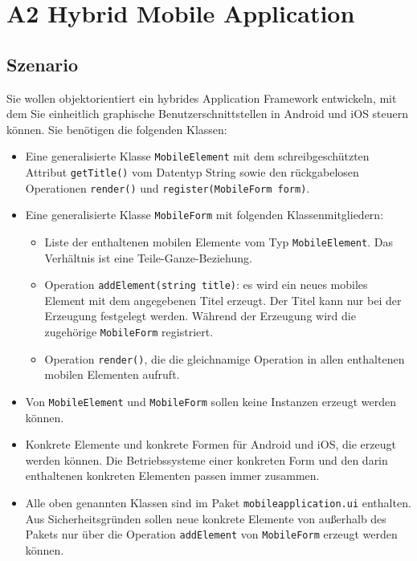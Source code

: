 \documentclass[main.tex]{subfiles}
\begin{document}
\section{A2 Hybrid Mobile Application}

\subsection{Szenario}

Sie wollen objektorientiert ein hybrides Application Framework entwickeln, mit dem Sie einheitlich graphische Benutzerschnittstellen in Android und iOS steuern können. Sie benötigen die folgenden Klassen:

\begin{itemize}
    \item Eine generalisierte Klasse \lstinline|MobileElement| mit dem schreibgeschützten Attribut \lstinline|getTitle()| vom Datentyp String sowie den rückgabelosen Operationen \lstinline|render()| und \lstinline|register(MobileForm form)|.
    \item Eine generalisierte Klasse \lstinline|MobileForm| mit folgenden Klassenmitgliedern:
    \begin{itemize}
        \item Liste der enthaltenen mobilen Elemente vom Typ \lstinline|MobileElement|. Das Verhältnis ist eine Teile-Ganze-Beziehung.
        \item Operation \lstinline|addElement(string title)|: es wird ein neues mobiles Element mit dem angegebenen Titel erzeugt. Der Titel kann nur bei der Erzeugung festgelegt werden. Während der Erzeugung wird die zugehörige \lstinline|MobileForm| registriert.
        \item Operation \lstinline|render()|, die die gleichnamige Operation in allen enthaltenen mobilen Elementen aufruft.
    \end{itemize}
    \item Von \lstinline|MobileElement| und \lstinline|MobileForm| sollen keine Instanzen erzeugt werden können.
    \item Konkrete Elemente und konkrete Formen für Android und iOS, die erzeugt werden können. Die Betriebssysteme einer konkreten Form und den darin enthaltenen konkreten Elementen passen immer zusammen.
    \item Alle oben genannten Klassen sind im Paket \lstinline|mobileapplication.ui| enthalten. Aus Sicherheitsgründen sollen neue konkrete Elemente von außerhalb des Pakets nur über die Operation \lstinline|addElement| von \lstinline|MobileForm| erzeugt werden können.

\end{itemize}
\end{document}
